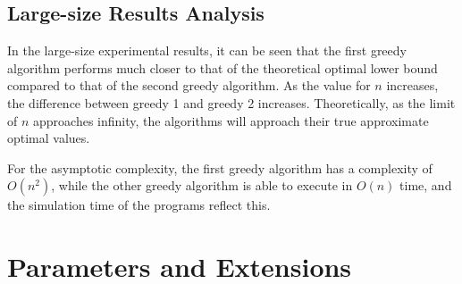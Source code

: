 \documentclass[11pt]{article}
\begin{document}
\begin{multicols}{2}
	\subsection{Large-size Results Analysis}
	In the large-size experimental results, it can be seen that the first greedy algorithm performs
	much closer to that of the theoretical optimal lower bound compared to that of the second greedy
	algorithm. As the value for ${n}$ increases, the difference between greedy 1 and greedy 2
	increases. Theoretically, as the limit of ${n}$ approaches infinity, the algorithms will
	approach their true approximate optimal values.

	For the asymptotic complexity, the first greedy algorithm has a complexity of ${O(n^2)}$, while the
	other greedy algorithm is able to execute in ${O({n})}$ time, and the simulation time of the
	programs reflect this.

	\section{Parameters and Extensions}

\end{multicols}
\end{document}
